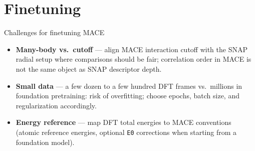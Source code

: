 \documentclass[aspectratio=169]{beamer}
\begin{document}
\section{Finetuning}

\begin{frame}{Challenges for finetuning MACE}
  \begin{itemize}
    \item \textbf{Many-body vs.\ cutoff} --- align MACE interaction cutoff with the SNAP radial setup where comparisons should be fair; correlation order in MACE is not the same object as SNAP descriptor depth.
    \item \textbf{Small data} --- a few dozen to a few hundred DFT frames vs.\ millions in foundation pretraining: risk of overfitting; choose epochs, batch size, and regularization accordingly.
    \item \textbf{Energy reference} --- map DFT total energies to MACE conventions (atomic reference energies, optional \texttt{E0} corrections when starting from a foundation model).
  \end{itemize}
\end{frame}
\end{document}
